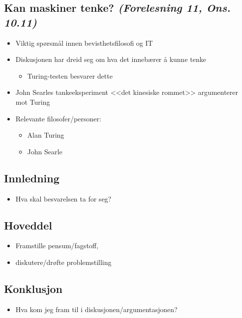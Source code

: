 \subsection*{Kan maskiner tenke? \textnormal{\textit{(Forelesning 11, Ons. 10.11)}}}
\begin{itemize}
    \item Viktig spørsmål innen bevisthetsfilosofi og IT
    \item Diskusjonen har dreid seg om hva det innebærer å kunne tenke
          \begin{itemize}
              \item Turing-testen besvarer dette
          \end{itemize}
    \item John Searles tankeeksperiment <<det kinesiske rommet>> argumenterer \\mot Turing
    \item Relevante filosofer/personer:
          \begin{itemize}
              \item Alan Turing
              \item John Searle
          \end{itemize}
\end{itemize}

\subsection*{Innledning}
\begin{itemize}
    \item Hva skal besvarelsen ta for seg? 
\end{itemize}

\subsection*{Hoveddel}
\begin{itemize}
    \item Framstille pensum/fagstoff, 
    \item diskutere/drøfte problemstilling
\end{itemize}


\subsection*{Konklusjon}
\begin{itemize}
    \item Hva kom jeg fram til i diskusjonen/argumentasjonen?
\end{itemize}

\newpage